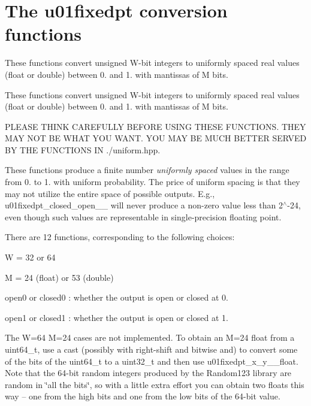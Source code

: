 \hypertarget{group__u01fixedpt}{}\section{The u01fixedpt conversion functions}
\label{group__u01fixedpt}


These functions convert unsigned W-\/bit integers to uniformly spaced real values (float or double) between 0. and 1. with mantissas of M bits.  


These functions convert unsigned W-\/bit integers to uniformly spaced real values (float or double) between 0. and 1. with mantissas of M bits. 

P\+L\+E\+A\+SE T\+H\+I\+NK C\+A\+R\+E\+F\+U\+L\+LY B\+E\+F\+O\+RE U\+S\+I\+NG T\+H\+E\+SE F\+U\+N\+C\+T\+I\+O\+NS. T\+H\+EY M\+AY N\+OT BE W\+H\+AT Y\+OU W\+A\+NT. Y\+OU M\+AY BE M\+U\+CH B\+E\+T\+T\+ER S\+E\+R\+V\+ED BY T\+HE F\+U\+N\+C\+T\+I\+O\+NS IN ./uniform.hpp.

These functions produce a finite number {\itshape uniformly spaced} values in the range from 0. to 1. with uniform probability. The price of uniform spacing is that they may not utilize the entire space of possible outputs. E.\+g., u01fixedpt\+\_\+closed\+\_\+open\+\_\+\_ will never produce a non-\/zero value less than 2$^\wedge$-\/24, even though such values are representable in single-\/precision floating point.

There are 12 functions, corresponding to the following choices\+:


\begin{DoxyItemize}
\item W = 32 or 64
\item M = 24 (float) or 53 (double)
\item open0 or closed0 \+: whether the output is open or closed at 0.
\item open1 or closed1 \+: whether the output is open or closed at 1.
\end{DoxyItemize}

The W=64 M=24 cases are not implemented. To obtain an M=24 float from a uint64\+\_\+t, use a cast (possibly with right-\/shift and bitwise and) to convert some of the bits of the uint64\+\_\+t to a uint32\+\_\+t and then use u01fixedpt\+\_\+x\+\_\+y\+\_\+\_\+float. Note that the 64-\/bit random integers produced by the Random123 library are random in \char`\"{}all the bits\char`\"{}, so with a little extra effort you can obtain two floats this way -- one from the high bits and one from the low bits of the 64-\/bit value.

